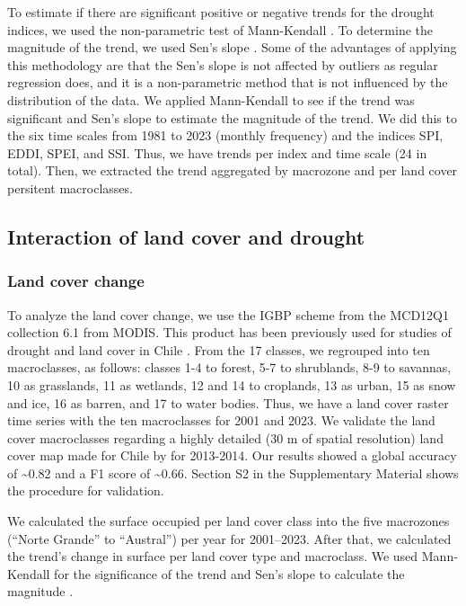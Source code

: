 \documentclass[
  authoryear,
  preprint,
  3p,
  onecolumn]{elsarticle}
\begin{document}
To estimate if there are significant positive or negative trends for the
drought indices, we used the non-parametric test of Mann-Kendall
\citep{Kendall1975}. To determine the magnitude of the trend, we used
Sen's slope \citep{Sen1968}. Some of the advantages of applying this
methodology are that the Sen's slope is not affected by outliers as
regular regression does, and it is a non-parametric method that is not
influenced by the distribution of the data. We applied Mann-Kendall to
see if the trend was significant and Sen's slope to estimate the
magnitude of the trend. We did this to the six time scales from 1981 to
2023 (monthly frequency) and the indices SPI, EDDI, SPEI, and SSI. Thus,
we have trends per index and time scale (24 in total). Then, we
extracted the trend aggregated by macrozone and per land cover persitent
macroclasses.

\hypertarget{interaction-of-land-cover-and-drought}{%
\subsection{Interaction of land cover and
drought}\label{interaction-of-land-cover-and-drought}}

\hypertarget{land-cover-change}{%
\subsubsection{Land cover change}\label{land-cover-change}}

To analyze the land cover change, we use the IGBP scheme from the
MCD12Q1 collection 6.1 from MODIS. This product has been previously used
for studies of drought and land cover in Chile
\citep{Fuentes2021, Zambrano2018}. From the 17 classes, we regrouped
into ten macroclasses, as follows: classes 1-4 to forest, 5-7 to
shrublands, 8-9 to savannas, 10 as grasslands, 11 as wetlands, 12 and 14
to croplands, 13 as urban, 15 as snow and ice, 16 as barren, and 17 to
water bodies. Thus, we have a land cover raster time series with the ten
macroclasses for 2001 and 2023. We validate the land cover macroclasses
regarding a highly detailed (30 m of spatial resolution) land cover map
made for Chile by \citet{Zhao2016} for 2013-2014. Our results showed a
global accuracy of \textasciitilde0.82 and a F1 score of
\textasciitilde0.66. Section S2 in the Supplementary Material shows the
procedure for validation.

We calculated the surface occupied per land cover class into the five
macrozones (``Norte Grande'' to ``Austral'') per year for 2001--2023.
After that, we calculated the trend's change in surface per land cover
type and macroclass. We used Mann-Kendall for the significance of the
trend \citep{Kendall1975} and Sen's slope to calculate the magnitude
\citep{Sen1968}.
\end{document}
